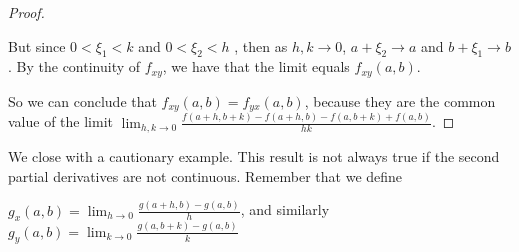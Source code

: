 \documentclass{ximera}
\begin{document}
\begin{proof}
\begin{free-response}
		But since $0<\xi_1 < k$ and $0<\xi_2<h$ , then as $h,k \to 0$, $a+\xi_2 \to a$ and $b+\xi_1 \to b$.  By the continuity of $f_{xy}$, we have that 
		the limit equals $f_{xy}(a,b)$.
		
		\end{free-response}
		
		So we can conclude that $f_{xy}(a,b) = f_{yx}(a,b)$, because they are the common value of the limit $\displaystyle\lim_{h,k \to 0} \frac{f(a+h,b+k)-f(a+h,b)-f(a,b+k)+f(a,b)}{hk}$.
	\end{proof}
	
	We close with a cautionary example.  This result is not always true if the second partial derivatives are not continuous.  Remember that we define
	
	$g_x(a,b) = \displaystyle\lim_{h \to 0} \frac{g(a+h,b)-g(a,b)}{h}$, and similarly $g_y(a,b) = \displaystyle\lim_{k \to 0} \frac{g(a,b+k)-g(a,b)}{k}$
	
\end{document}
